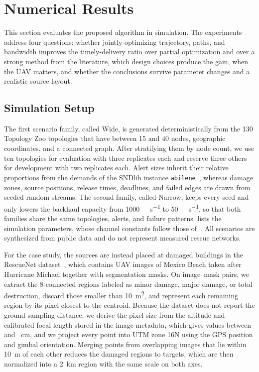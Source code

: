 \section{Numerical Results}
\label{sec:experiments}

This section evaluates the proposed algorithm in simulation. The experiments address four questions: whether jointly optimizing trajectory, paths, and bandwidth improves the timely-delivery ratio over partial optimization and over a strong method from the literature, which design choices produce the gain, when the UAV matters, and whether the conclusions survive parameter changes and a realistic source layout.

\subsection{Simulation Setup}
\label{sec:setup}
The first scenario family, called Wide, is generated deterministically from the 130 Topology Zoo topologies that have between 15 and 40 nodes, geographic coordinates, and a connected graph. After stratifying them by node count, we use ten topologies for evaluation with three replicates each and reserve three others for development with two replicates each. Alert sizes inherit their relative proportions from the demands of the SNDlib instance \texttt{abilene}~\cite{orlowski2010sndlib}, whereas damage zones, source positions, release times, deadlines, and failed edges are drawn from seeded random streams. The second family, called Narrow, keeps every seed and only lowers the backhaul capacity from \qty{1000}{\kilo\bit\per\second} to \qty{50}{\kilo\bit\per\second}, so that both families share the same topologies, alerts, and failure patterns.  lists the simulation parameters, whose channel constants follow those of~\cite{huang2025ddatsap}. All scenarios are synthesized from public data and do not represent measured rescue networks.



\label{sec:rescuenet}
For the case study, the sources are instead placed at damaged buildings in the RescueNet dataset~\cite{rahnemoonfar2023rescuenet}, which contains UAV images of Mexico Beach taken after Hurricane Michael together with segmentation masks. On \ResultExtImageCount{} image--mask pairs, we extract the 8-connected regions labeled as minor damage, major damage, or total destruction, discard those smaller than \qty{10}{\metre\squared}, and represent each remaining region by its pixel closest to the centroid. Because the dataset does not report the ground sampling distance, we derive the pixel size from the altitude and calibrated focal length stored in the image metadata, which gives values between \ResultExtGsdMin{} and \ResultExtGsdMax~\unit{\centi\metre}, and we project every point into UTM zone 16N using the GPS position and gimbal orientation. Merging points from overlapping images that lie within \qty{10}{\metre} of each other reduces the \ResultExtRegionCount{} damaged regions to \ResultExtTargetCount{} targets, which are then normalized into a \qty{2}{\kilo\metre} region with the same scale on both axes.


